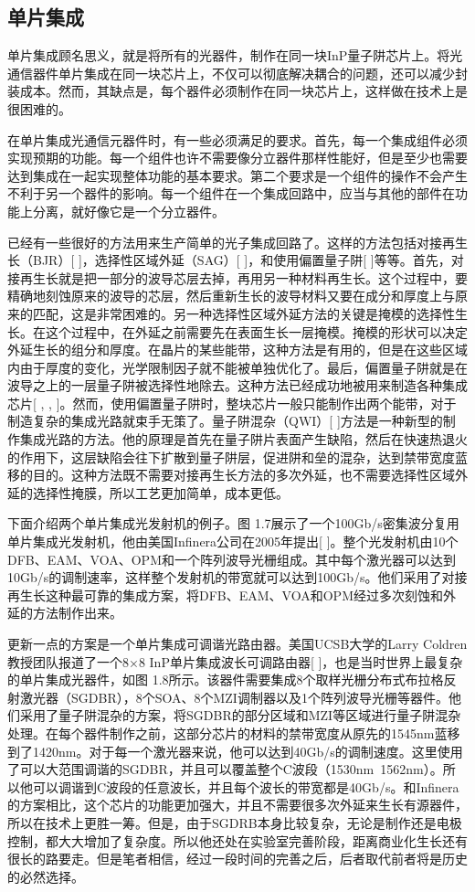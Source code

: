 \documentclass[oneside]{ZJUthesis}
\begin{document}
\subsection{单片集成}

单片集成顾名思义，就是将所有的光器件，制作在同一块InP量子阱芯片上。将光通信器件单片集成在同一块芯片上，不仅可以彻底解决耦合的问题，还可以减少封装成本。然而，其缺点是，每个器件必须制作在同一块芯片上，这样做在技术上是很困难的。

在单片集成光通信元器件时，有一些必须满足的要求。首先，每一个集成组件必须实现预期的功能。每一个组件也许不需要像分立器件那样性能好，但是至少也需要达到集成在一起实现整体功能的基本要求。第二个要求是一个组件的操作不会产生不利于另一个器件的影响。每一个组件在一个集成回路中，应当与其他的部件在功能上分离，就好像它是一个分立器件。

已经有一些很好的方法用来生产简单的光子集成回路了。这样的方法包括对接再生长（BJR）[ ]，选择性区域外延（SAG）[ ]，和使用偏置量子阱[ ]等等。首先，对接再生长就是把一部分的波导芯层去掉，再用另一种材料再生长。这个过程中，要精确地刻蚀原来的波导的芯层，然后重新生长的波导材料又要在成分和厚度上与原来的匹配，这是非常困难的。另一种选择性区域外延方法的关键是掩模的选择性生长。在这个过程中，在外延之前需要先在表面生长一层掩模。掩模的形状可以决定外延生长的组分和厚度。在晶片的某些能带，这种方法是有用的，但是在这些区域内由于厚度的变化，光学限制因子就不能被单独优化了。最后，偏置量子阱就是在波导之上的一层量子阱被选择性地除去。这种方法已经成功地被用来制造各种集成芯片[ , , ]。然而，使用偏置量子阱时，整块芯片一般只能制作出两个能带，对于制造复杂的集成光路就束手无策了。量子阱混杂（QWI）[ ]方法是一种新型的制作集成光路的方法。他的原理是首先在量子阱片表面产生缺陷，然后在快速热退火的作用下，这层缺陷会往下扩散到量子阱层，促进阱和垒的混杂，达到禁带宽度蓝移的目的。这种方法既不需要对接再生长方法的多次外延，也不需要选择性区域外延的选择性掩膜，所以工艺更加简单，成本更低。

下面介绍两个单片集成光发射机的例子。图 1.7展示了一个100Gb/s密集波分复用单片集成光发射机，他由美国Infinera公司在2005年提出[ ]。整个光发射机由10个DFB、EAM、VOA、OPM和一个阵列波导光栅组成。其中每个激光器可以达到10Gb/s的调制速率，这样整个发射机的带宽就可以达到100Gb/s。他们采用了对接再生长这种最可靠的集成方案，将DFB、EAM、VOA和OPM经过多次刻蚀和外延的方法制作出来。

更新一点的方案是一个单片集成可调谐光路由器。美国UCSB大学的Larry Coldren教授团队报道了一个8×8 InP单片集成波长可调路由器[ ]，也是当时世界上最复杂的单片集成光器件，如图 1.8所示。该器件需要集成8个取样光栅分布式布拉格反射激光器（SGDBR），8个SOA、8个MZI调制器以及1个阵列波导光栅等器件。他们采用了量子阱混杂的方案，将SGDBR的部分区域和MZI等区域进行量子阱混杂处理。在每个器件制作之前，这部分芯片的材料的禁带宽度从原先的1545nm蓝移到了1420nm。对于每一个激光器来说，他可以达到40Gb/s的调制速度。这里使用了可以大范围调谐的SGDBR，并且可以覆盖整个C波段（1530nm~1562nm）。所以他可以调谐到C波段的任意波长，并且每个波长的带宽都是40Gb/s。和Infinera的方案相比，这个芯片的功能更加强大，并且不需要很多次外延来生长有源器件，所以在技术上更胜一筹。但是，由于SGDRB本身比较复杂，无论是制作还是电极控制，都大大增加了复杂度。所以他还处在实验室完善阶段，距离商业化生长还有很长的路要走。但是笔者相信，经过一段时间的完善之后，后者取代前者将是历史的必然选择。
\end{document}
